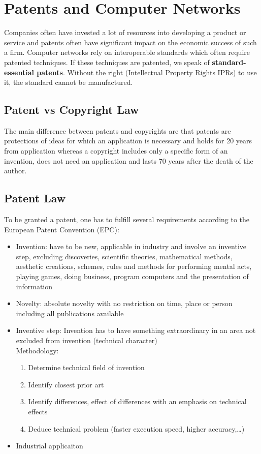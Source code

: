 
\section{Patents and Computer Networks}
Companies often have invested a lot of resources into developing a product or service and patents often have significant impact on the economic success of such a firm.
Computer networks rely on interoperable standards which often require patented techniques.
If these techniques are patented, we speak of \textbf{standard-essential patents}.
Without the right (Intellectual Property Rights IPRs) to use it, the standard cannot be manufactured.

\subsection{Patent vs Copyright Law}
The main difference between patents and copyrights are that patents are protections of ideas for which an application is necessary and holds for 20 years from application whereas a copyright includes only a specific form of an invention, does not need an application and lasts 70 years after the death of the author.

\subsection{Patent Law}
To be granted a patent, one has to fulfill several requirements according to the European Patent Convention (EPC):
\begin{itemize}
  \item Invention: have to be new, applicable in industry and involve an inventive step, excluding discoveries, scientific theories, mathematical methods, aesthetic creations, schemes, rules and methods for performing mental acts, playing games, doing business, program computers and the presentation of information
  \item Novelty: absolute novelty with no restriction on time, place or person including all publications available
  \item Inventive step: Invention has to have something extraordinary in an area not excluded from invention (technical character)\\
    Methodology:
    \begin{enumerate}
      \item Determine technical field of invention
      \item Identify closest prior art
      \item Identify differences, effect of differences with an emphasis on technical effects
      \item Deduce technical problem (faster execution speed, higher accuracy,\dots)
    \end{enumerate}
  \item Industrial applicaiton
\end{itemize}
